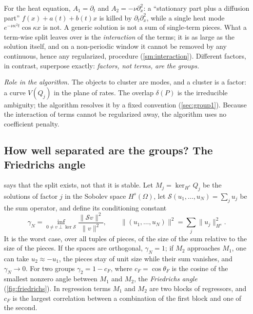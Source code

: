 \documentclass[11pt]{article}
\theoremstyle{plain}
\theoremstyle{definition}
\theoremstyle{remark}
\newcommand{\Var}{V}                        %
\newcommand{\sumop}{\mathcal{S}}            %
\newcommand{\cF}{c_{F}}                     %
\newcommand{\thetaF}{\theta_{F}}            %
\newcommand{\gN}{\gamma_{N}}                %
\newcommand{\deltaP}{\delta(P)}             %
\newcommand{\Hs}{H^{s}}                     %
\newcommand{\norm}[1]{\lVert#1\rVert}
\newcommand{\roleinalg}[1]{\par\noindent\emph{Role in the algorithm.} #1\par}
\newcommand{\SMinteraction}{\cref{sm:interaction}}
\begin{document}
For the heat equation, $A_1=\partial_t$ and $A_2=-\nu\partial_x^2$: a ``stationary part plus a diffusion part''
$f(x)+a(t)+b(t)x$ is killed by $\partial_t\partial_x^2$, while a single heat mode $e^{-\nu\kappa^2t}\cos\kappa x$ is not. A
generic solution is not a sum of single-term pieces. What a term-wise split leaves over is the \emph{interaction} of the
terms; it is as large as the solution itself, and on a non-periodic window it cannot be removed by any continuous,
hence any regularized, procedure (\SMinteraction). Different factors, in contrast, superpose exactly: \emph{factors, not
terms, are the groups.}

\roleinalg{The objects to cluster are modes, and a cluster is a factor: a curve $\Var(Q_j)$ in the plane of rates. The
overlap $\deltaP$ is the irreducible ambiguity; the algorithm resolves it by a fixed convention (\cref{sec:group1}).
Because the interaction of terms cannot be regularized away, the algorithm uses no coefficient penalty.}

\subsection{How well separated are the groups? The Friedrichs angle}\label{sec:cond}
 says that the split exists, not that it is stable. Let $M_j=\ker_{\Hs}Q_j$ be the solutions of factor
$j$ in the Sobolev space $\Hs(\Omega)$, let $\sumop(u_1,\dots,u_N)=\sum_ju_j$ be the sum operator, and define its
conditioning constant
\begin{equation}\label{eq:gammaN}
  \gN=\inf_{0\neq v\perp\ker\sumop}\frac{\norm{\sumop v}^2}{\norm{v}^2},\qquad \norm{(u_1,\dots,u_N)}^2=\sum_j\norm{u_j}_{\Hs}^2 .
\end{equation}
It is the worst case, over all tuples of pieces, of the size of the sum relative to the size of the pieces. If the
spaces are orthogonal, $\gN=1$; if $M_2$ approaches $M_1$, one can take $u_2\approx-u_1$, the pieces stay of unit size
while their sum vanishes, and $\gN\to0$. For two groups $\gamma_2=1-\cF$, where $\cF=\cos\thetaF$ is the cosine of the
smallest nonzero angle between $M_1$ and $M_2$, the \emph{Friedrichs angle}~\cite{Deu01} (\cref{fig:friedrichs}). In
regression terms $M_1$ and $M_2$ are two blocks of regressors, and $\cF$ is the largest correlation between a combination
of the first block and one of the second.
\end{document}
